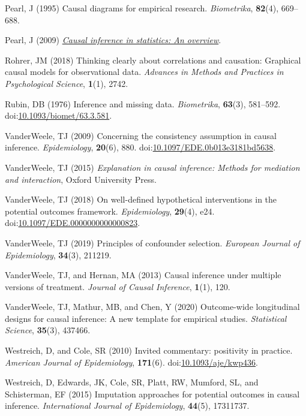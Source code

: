\documentclass[
  singlecolumn]{article}
\newlength{\cslhangindent}
\newenvironment{CSLReferences}[2] %
 {\begin{list}{}{%
  \setlength{\itemindent}{0pt}
  \setlength{\leftmargin}{0pt}
  \setlength{\parsep}{0pt}
  \ifodd #1
   \setlength{\leftmargin}{\cslhangindent}
   \setlength{\itemindent}{-1\cslhangindent}
  \fi
  \setlength{\itemsep}{#2\baselineskip}}}
 {\end{list}}
\begin{document}
\begin{CSLReferences}{1}{0}
Pearl, J (1995) Causal diagrams for empirical research.
\emph{Biometrika}, \textbf{82}(4), 669--688.

Pearl, J (2009) \emph{\href{https://doi.org/10.1214/09-SS057}{Causal
inference in statistics: An overview}}.

Rohrer, JM (2018) Thinking clearly about correlations and causation:
Graphical causal models for observational data. \emph{Advances in
Methods and Practices in Psychological Science}, \textbf{1}(1), 2742.

Rubin, DB (1976) Inference and missing data. \emph{Biometrika},
\textbf{63}(3), 581--592.
doi:\href{https://doi.org/10.1093/biomet/63.3.581}{10.1093/biomet/63.3.581}.

VanderWeele, TJ (2009) Concerning the consistency assumption in causal
inference. \emph{Epidemiology}, \textbf{20}(6), 880.
doi:\href{https://doi.org/10.1097/EDE.0b013e3181bd5638}{10.1097/EDE.0b013e3181bd5638}.

VanderWeele, TJ (2015) \emph{Explanation in causal inference: Methods
for mediation and interaction}, Oxford University Press.

VanderWeele, TJ (2018) On well-defined hypothetical interventions in the
potential outcomes framework. \emph{Epidemiology}, \textbf{29}(4), e24.
doi:\href{https://doi.org/10.1097/EDE.0000000000000823}{10.1097/EDE.0000000000000823}.

VanderWeele, TJ (2019) Principles of confounder selection.
\emph{European Journal of Epidemiology}, \textbf{34}(3), 211219.

VanderWeele, TJ, and Hernan, MA (2013) Causal inference under multiple
versions of treatment. \emph{Journal of Causal Inference},
\textbf{1}(1), 120.

VanderWeele, TJ, Mathur, MB, and Chen, Y (2020) Outcome-wide
longitudinal designs for causal inference: A new template for empirical
studies. \emph{Statistical Science}, \textbf{35}(3), 437466.

Westreich, D, and Cole, SR (2010) Invited commentary: positivity in
practice. \emph{American Journal of Epidemiology}, \textbf{171}(6).
doi:\href{https://doi.org/10.1093/aje/kwp436}{10.1093/aje/kwp436}.

Westreich, D, Edwards, JK, Cole, SR, Platt, RW, Mumford, SL, and
Schisterman, EF (2015) Imputation approaches for potential outcomes in
causal inference. \emph{International Journal of Epidemiology},
\textbf{44}(5), 17311737.

\end{CSLReferences}
\end{document}
